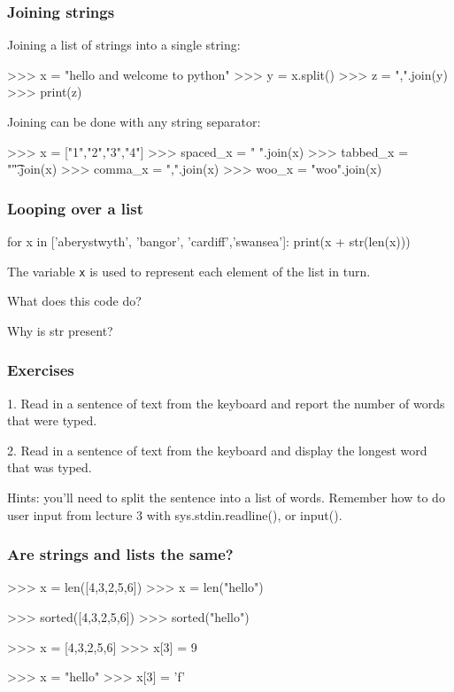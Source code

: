\documentclass{beamer}
\begin{document}
\begin{frame}[fragile]
\frametitle{Joining strings}
Joining a list of strings into a single string:
\begin{code}
>>> x = "hello and welcome to python"
>>> y = x.split()
>>> z = ",".join(y)
>>> print(z)
\end{code}

Joining can be done with any string separator:
\begin{code}
>>> x = ["1","2","3","4"]
>>> spaced_x = " ".join(x)
>>> tabbed_x = "\t".join(x)
>>> comma_x = ",".join(x)
>>> woo_x = "woo".join(x)
\end{code}
\end{frame}

\begin{frame}[fragile]
\frametitle{Looping over a list}
\begin{code}
for x in ['aberystwyth', 'bangor', 'cardiff','swansea']:
   print(x + str(len(x)))
\end{code}

The variable \texttt{x} is used to represent each element of the list
in turn.

What does this code do?

Why is str present?
\end{frame}

\begin{frame}[fragile]
\frametitle{Exercises}
1. Read in a sentence of text from the keyboard and report the number of
words that were typed.

\bigskip

2. Read in a sentence of text from the keyboard and display the longest word
that was typed.

\bigskip 

Hints: you'll need to split the sentence into a list of words. Remember
how to do user input from lecture 3 with sys.stdin.readline(), or input().
\end{frame}


\begin{frame}[fragile]
\frametitle{Are strings and lists the same?}
\begin{code}
>>> x = len([4,3,2,5,6])
>>> x = len("hello")

>>> sorted([4,3,2,5,6])
>>> sorted("hello")

>>> x = [4,3,2,5,6]
>>> x[3] = 9

>>> x = "hello"
>>> x[3] = 'f'
\end{code}

\end{frame}
\end{document}
